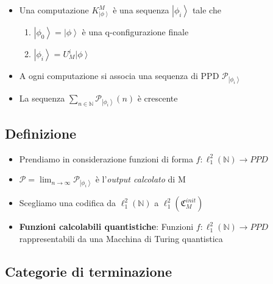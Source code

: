\documentclass{beamer}
\begin{document}
\begin{frame}{\secname}{\subsecname}
	\begin{itemize}
		\item Una computazione \(K^{M}_{\left | \phi \right \rangle}\) è una sequenza \(\left | \phi_{i} \right \rangle\) tale che
		\begin{enumerate}
			\item \(\left | \phi_{0} \right \rangle = \left | \phi \right \rangle\) è una q-configurazione finale
			\item \(\left | \phi_{i} \right \rangle = U_{M}^{i}\left | \phi \right \rangle\)
		\end{enumerate}
		\item A ogni computazione si associa una sequenza di PPD \( \mathcal{P}_{\left | \phi_{i} \right \rangle} \)
		\item La sequenza \(\sum_{n \in \mathbb{N}} \mathcal{P}_{\left | \phi_{i} \right \rangle} \left ( n \right )\) è crescente
	\end{itemize}
\end{frame}

\subsection{Definizione}

\begin{frame}{\secname}{\subsecname}
	\begin{itemize}
		\item Prendiamo in considerazione funzioni di forma \( f : \ell^{2}_{1} \left ( \mathbb{N} \right ) \rightarrow PPD \)
		\item \( \mathcal{P} = \lim_{n \to \infty} \mathcal{P}_{\left | \phi_{i} \right \rangle} \) è l'\textit{output calcolato} di M
		\item Scegliamo una codifica da \( \ell^{2}_{1} \left ( \mathbb{N} \right ) \) a \( \ell^{2}_{1} \left ( \mathfrak{C}^{init}_M \right ) \)
		\item \textbf{Funzioni calcolabili quantistiche}: Funzioni \( f : \ell^{2}_{1} \left ( \mathbb{N} \right ) \rightarrow PPD \) rappresentabili da una Macchina di Turing quantistica
	\end{itemize}
\end{frame}

\subsection{Categorie di terminazione}
\end{document}
